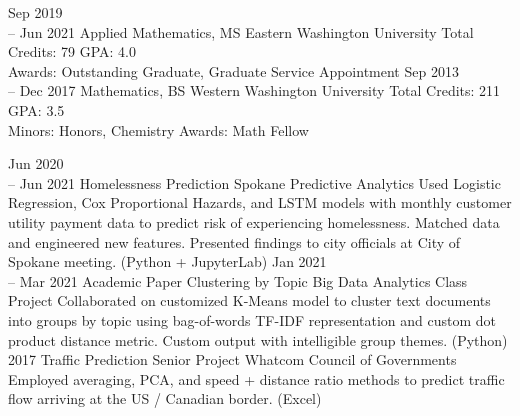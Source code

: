 \documentclass[11pt]{developercv} %
\newcommand{\vsp}{\vspace{-10pt}}
\begin{document}


\begin{entrylist}
	\entry
		{Sep 2019\\
		-- Jun 2021}
		{Applied Mathematics, MS}
		{Eastern Washington University}
		{Total Credits: 79 \hspace{103pt} GPA: 4.0 \\
		Awards: Outstanding Graduate, Graduate Service Appointment
		}
	\entry
		{Sep 2013\\
		-- Dec 2017}
		{Mathematics, BS}
		{Western Washington University}
		{Total Credits: 211 \hspace{100pt} GPA: 3.5 \\
		Minors: Honors, Chemistry
		Awards: Math Fellow
		}
\end{entrylist}

\vsp



\begin{entrylist}
	\entry
	    {Jun 2020 \\
		-- Jun 2021}
	    {Homelessness Prediction}
	    {Spokane Predictive Analytics}
	    {Used Logistic Regression, Cox Proportional Hazards, and LSTM models with monthly customer utility payment data to predict risk of experiencing homelessness. Matched data and engineered new features. Presented findings to city officials at City of Spokane meeting. (Python + JupyterLab)}
	\entry
		{Jan 2021 \\
		-- Mar 2021}
		{Academic Paper Clustering by Topic}
		{Big Data Analytics Class Project}
		{Collaborated on customized K-Means model to cluster text documents into groups by topic using bag-of-words TF-IDF representation and custom dot product distance metric. Custom output with intelligible group themes. (Python)}
	\entry
		{2017}
		{Traffic Prediction Senior Project}
		{Whatcom Council of Governments}
		{Employed averaging, PCA, and speed + distance ratio methods to predict traffic flow arriving at the US / Canadian border. (Excel)}
\end{entrylist}
\end{document}
